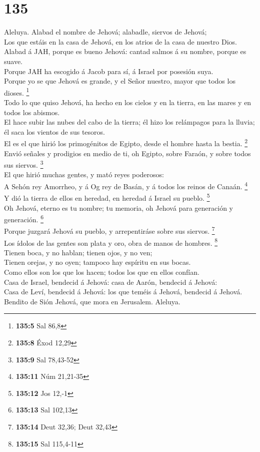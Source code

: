 \hypertarget{section-134}{%
\section{135}\label{section-134}}

 Aleluya. Alabad el nombre de Jehová; alabadle, siervos de
Jehová;\\
 Los que estáis en la casa de Jehová, en los atrios de la
casa de nuestro Dios.\\
 Alabad á JAH, porque es bueno Jehová: cantad salmos á su
nombre, porque es suave.\\
 Porque JAH ha escogido á Jacob para sí, á Israel por
posesión suya.\\
 Porque yo se que Jehová es grande, y el Señor nuestro,
mayor que todos los dioses. \footnote{\textbf{135:5} Sal 86,8}\\
 Todo lo que quiso Jehová, ha hecho en los cielos y en la
tierra, en las mares y en todos los abismos.\\
 El hace subir las nubes del cabo de la tierra; él hizo
los relámpagos para la lluvia; él saca los vientos de sus tesoros.\\
 El es el que hirió los primogénitos de Egipto, desde el
hombre hasta la bestia. \footnote{\textbf{135:8} Éxod 12,29}\\
 Envió señales y prodigios en medio de ti, oh Egipto,
sobre Faraón, y sobre todos sus siervos. \footnote{\textbf{135:9} Sal
  78,43-52}\\
 El que hirió muchas gentes, y mató reyes poderosos:\\
 A Sehón rey Amorrheo, y á Og rey de Basán, y á todos los
reinos de Canaán. \footnote{\textbf{135:11} Núm 21,21-35}\\
 Y dió la tierra de ellos en heredad, en heredad á Israel
su pueblo. \footnote{\textbf{135:12} Jos 12,-1}\\
 Oh Jehová, eterno es tu nombre; tu memoria, oh Jehová
para generación y generación. \footnote{\textbf{135:13} Sal 102,13}\\
 Porque juzgará Jehová su pueblo, y arrepentiráse sobre
sus siervos. \footnote{\textbf{135:14} Deut 32,36; Deut 32,43}\\
 Los ídolos de las gentes son plata y oro, obra de manos
de hombres. \footnote{\textbf{135:15} Sal 115,4-11}\\
 Tienen boca, y no hablan; tienen ojos, y no ven;\\
 Tienen orejas, y no oyen; tampoco hay espíritu en sus
bocas.\\
 Como ellos son los que los hacen; todos los que en ellos
confían.\\
 Casa de Israel, bendecid á Jehová: casa de Aarón,
bendecid á Jehová:\\
 Casa de Leví, bendecid á Jehová: los que teméis á
Jehová, bendecid á Jehová.\\
 Bendito de Sión Jehová, que mora en Jerusalem. Aleluya.


